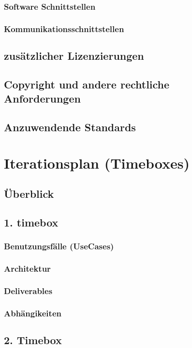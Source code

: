 \documentclass{article}
\begin{document}
\subsubsection{Software Schnittstellen}
\subsubsection{Kommunikationsschnittstellen}
\subsection{zusätzlicher Lizenzierungen}
\subsection{Copyright und andere rechtliche Anforderungen}
\subsection{Anzuwendende Standards}

\section{Iterationsplan (Timeboxes)}
\subsection{Überblick}
\subsection{1. timebox}
\subsubsection{Benutzungsfälle (UseCases)}
\subsubsection{Architektur}
\subsubsection{Deliverables}
\subsubsection{Abhängikeiten}

\subsection{2. Timebox}
\end{document}
